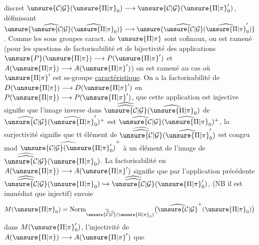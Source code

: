 discret $\unsure{\mathcal{C}|\mathcal{G}}(\unsure{\Pi|\pi}_0)\longrightarrow\unsure{\mathcal{C}|\mathcal{G}}(\unsure{\Pi|\pi}'_0)$, définissant  $\unsure{\widehat{\unsure{\mathcal{C}|\mathcal{G}}}(\widehat{\unsure{\Pi|\pi}}_0)}\longrightarrow\unsure{\widehat{\unsure{\mathcal{C}|\mathcal{G}}}(\widehat{\unsure{\Pi|\pi}}'_0)}$. Comme les sous groupes  caract. de $\unsure{\Pi|\pi}$ sont cofinaux, on est ramené (pour les questions de factorisabilité  et de bijectivité des applications $\unsure{P}(\unsure{\Pi|\pi})\longrightarrow P(\unsure{\Pi|\pi}')$ et $A(\unsure{\Pi|\pi})\longrightarrow A(\unsure{\Pi|\pi}')$) on est ramené au cas où $\unsure{\Pi|\pi}'$ est ss-groupe \uline{caractéristique}. On a   la factorisabilité de $D(\unsure{\Pi|\pi})\longrightarrow D(\unsure{\Pi|\pi}')$ en $P(\unsure{\Pi|\pi})\longrightarrow P(\unsure{\Pi|\pi}')$,   que cette application est injective   
 signifie que l'image inverse dans $\widehat{\widehat{\unsure{\mathcal{C}|\mathcal{G}}}}(\widehat{\unsure{\Pi|\pi}}_0)$ de $\widehat{\unsure{\mathcal{C}|\mathcal{G}}}(\widehat{\unsure{\Pi|\pi}}'_0)^+$ est $\widehat{\unsure{\mathcal{C}|\mathcal{G}}}(\widehat{\unsure{\Pi|\pi}}_0)^+$, la surjectivité  signifie que tt élément de $\widehat{\widehat{\unsure{\mathcal{C}|\mathcal{G}}}}(\widehat{\unsure{\Pi|\pi}}'_0)$ est congru mod $\widehat{\unsure{\mathcal{C}|\mathcal{G}}(\unsure{\Pi|\pi}'_0)}^+$ à un élément de l'image de $\widehat{\widehat{\unsure{\mathcal{C}|\mathcal{G}}}}(\unsure{\Pi|\pi}_0)$. La factorisabilité en $A(\unsure{\Pi|\pi})\longrightarrow A(\unsure{\Pi|\pi}')$ signifie que par  l'application précédente $\widehat{\widehat{\unsure{\mathcal{C}|\mathcal{G}}}}(\unsure{\Pi|\pi}_0)\hookrightarrow\widehat{\widehat{\unsure{\mathcal{C}|\mathcal{G}}}}(\unsure{\Pi|\pi}'_0)$, (NB il est immédiat que  injectif)  envoie
\[
M(\unsure{\Pi|\pi}_0)=\operatorname{Norm}_{\unsure{\widehat{\widehat{\mathcal{C}}}|\widehat{\mathcal{C}}}(\unsure{\Pi|\pi}_0)}\bigl(\widehat{\unsure{\mathcal{C}|\mathcal{G}}}^{+}(\unsure{\Pi|\pi}_0)\bigr)
\]
dans $M(\unsure{\Pi|\pi}'_0)$, l'injectivité de $A(\unsure{\Pi|\pi})\longrightarrow A(\unsure{\Pi|\pi}')$ que

